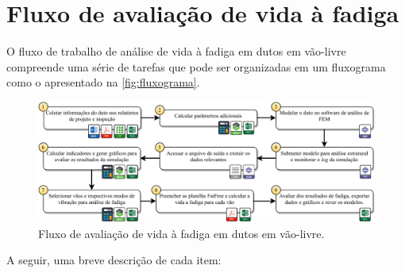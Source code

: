 \section{Fluxo de avaliação de vida à fadiga}\label{sec:workflow}


O fluxo de trabalho de análise de vida à fadiga em dutos em vão-livre compreende uma série de tarefas que pode ser organizadas em um fluxograma como o apresentado na \autoref{fig:fluxograma}. %

\begin{figure}[!ht]
    \centering
    \caption{Fluxo de avaliação de vida à fadiga em dutos em vão-livre.}\label{fig:fluxograma}
    \includegraphics[width=\textwidth]{imagens/fluxograma.pdf}
\end{figure}

A seguir, uma breve descrição de cada item:

